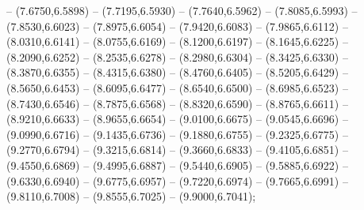 {	-- (7.6750,6.5898)
	-- (7.7195,6.5930)
	-- (7.7640,6.5962)
	-- (7.8085,6.5993)
	-- (7.8530,6.6023)
	-- (7.8975,6.6054)
	-- (7.9420,6.6083)
	-- (7.9865,6.6112)
	-- (8.0310,6.6141)
	-- (8.0755,6.6169)
	-- (8.1200,6.6197)
	-- (8.1645,6.6225)
	-- (8.2090,6.6252)
	-- (8.2535,6.6278)
	-- (8.2980,6.6304)
	-- (8.3425,6.6330)
	-- (8.3870,6.6355)
	-- (8.4315,6.6380)
	-- (8.4760,6.6405)
	-- (8.5205,6.6429)
	-- (8.5650,6.6453)
	-- (8.6095,6.6477)
	-- (8.6540,6.6500)
	-- (8.6985,6.6523)
	-- (8.7430,6.6546)
	-- (8.7875,6.6568)
	-- (8.8320,6.6590)
	-- (8.8765,6.6611)
	-- (8.9210,6.6633)
	-- (8.9655,6.6654)
	-- (9.0100,6.6675)
	-- (9.0545,6.6696)
	-- (9.0990,6.6716)
	-- (9.1435,6.6736)
	-- (9.1880,6.6755)
	-- (9.2325,6.6775)
	-- (9.2770,6.6794)
	-- (9.3215,6.6814)
	-- (9.3660,6.6833)
	-- (9.4105,6.6851)
	-- (9.4550,6.6869)
	-- (9.4995,6.6887)
	-- (9.5440,6.6905)
	-- (9.5885,6.6922)
	-- (9.6330,6.6940)
	-- (9.6775,6.6957)
	-- (9.7220,6.6974)
	-- (9.7665,6.6991)
	-- (9.8110,6.7008)
	-- (9.8555,6.7025)
	-- (9.9000,6.7041);
}
